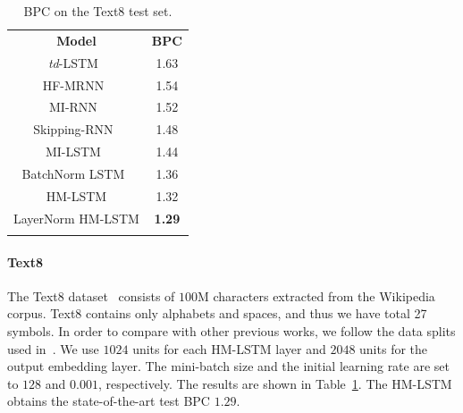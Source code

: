 \documentclass{article} %
\begin{document}
\begin{table}[t]
    \vspace*{-0.5cm}
	\centering
    {\small
    \begin{tabular}{c c }
        \Xhline{0.8pt}
        \multicolumn{2}{c}{\bf Text8}\\
        \hline
        {\bf Model} & {\bf BPC} \\
        \hline
        {\it td}-LSTM~\citep{zhang2016architectural}         & 1.63 \\
        HF-MRNN~\citep{mikolov2012subword}                   & 1.54 \\
        MI-RNN~\citep{wu2016multiplicative}                  & 1.52 \\
        Skipping-RNN~\citep{pachitariu2013regularization}    & 1.48 \\
        MI-LSTM~\citep{wu2016multiplicative}                 & 1.44 \\
        BatchNorm LSTM~\citep{cooijmans2016recurrent}        & 1.36 \\
        \hline
        HM-LSTM                                              & 1.32 \\
        LayerNorm HM-LSTM                             & {\bf 1.29} \\
        \Xhline{0.8pt}
    \end{tabular}
    }
   	\caption{BPC on the Text8 test set.}
    \label{tab:Text8_bpc}
\end{table}

\paragraph{Text8}
The Text8 dataset~\citep{mahoney2009large} consists of $100$M characters extracted from the Wikipedia corpus. 
Text8 contains only alphabets and spaces, and thus we have total 27 symbols. 
In order to compare with other previous works, we follow the data splits used in~\citet{mikolov2012subword}.
We use $1024$ units for each HM-LSTM layer and $2048$ units for the output embedding layer.
The mini-batch size and the initial learning rate are set to $128$ and $0.001$, respectively. 
The results are shown in Table~\ref{tab:Text8_bpc}.
The HM-LSTM obtains the state-of-the-art test BPC $1.29$.
\end{document}
